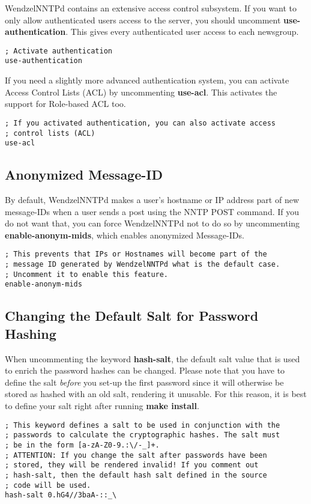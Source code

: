 WendzelNNTPd contains an extensive access control subsystem. If you want to only allow authenticated users access to the server, you should uncomment {\bf use-authentication}. This gives every authenticated user access to each newsgroup.

\begin{verbatim}
; Activate authentication
use-authentication
\end{verbatim}

If you need a slightly more advanced authentication system, you can activate Access Control Lists (ACL) by uncommenting {\bf use-acl}. This activates the support for Role-based ACL too.

\begin{verbatim}
; If you activated authentication, you can also activate access
; control lists (ACL)
use-acl
\end{verbatim}

\subsection{Anonymized Message-ID}

By default, WendzelNNTPd makes a user's hostname or IP address part of new message-IDs when a user sends a post using the NNTP POST command. If you do not want that, you can force WendzelNNTPd not to do so by uncommenting {\bf enable-anonym-mids}, which enables anonymized Message-IDs.

\begin{verbatim}
; This prevents that IPs or Hostnames will become part of the
; message ID generated by WendzelNNTPd what is the default case.
; Uncomment it to enable this feature.
enable-anonym-mids
\end{verbatim}

\subsection{Changing the Default Salt for Password Hashing}

When uncommenting the keyword {\bf hash-salt}, the default salt value that is used to enrich the password hashes can be changed. Please note that you have to define the salt {\it before} you set-up the first password since it will otherwise be stored as hashed with an old salt, rendering it unusable. For this reason, it is best to define your salt right after running {\bf make install}.

\begin{verbatim}
; This keyword defines a salt to be used in conjunction with the
; passwords to calculate the cryptographic hashes. The salt must
; be in the form [a-zA-Z0-9.:\/-_]+.
; ATTENTION: If you change the salt after passwords have been
; stored, they will be rendered invalid! If you comment out
; hash-salt, then the default hash salt defined in the source
; code will be used.
hash-salt 0.hG4//3baA-::_\
\end{verbatim}

